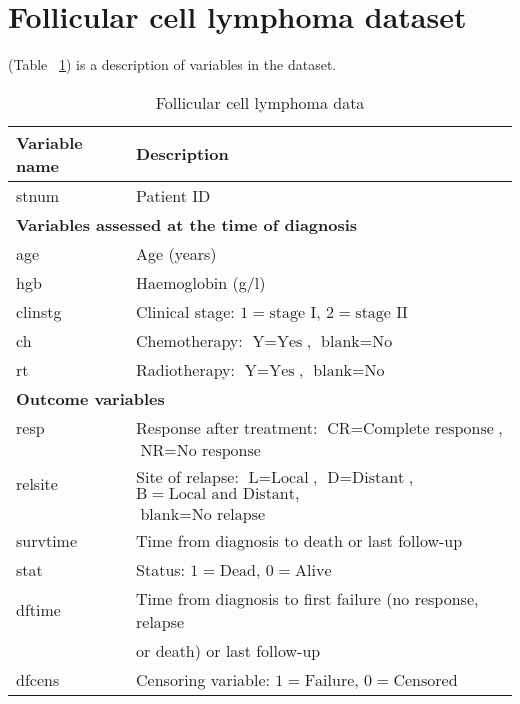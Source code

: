 \documentclass[times, doublespace]{simauth}
\begin{document}
\section{Follicular cell lymphoma dataset}\label{appA}
(Table ~\ref{tab:lymph}) is a description of variables in the dataset.
\begin{table}[t]\label{follicular}
	\begin{center}
		\caption{Follicular cell lymphoma data}\label{tab:lymph}
		\begin{tabular}{ll}
		\hline
			Variable name&Description\\
		\hline
		stnum & Patient ID\\
		\cline{1-2}
		\multicolumn{2}{l}{{\bf Variables assessed at the time of diagnosis}}\\
		age & Age (years)\\
		hgb & Haemoglobin (g/l)\\
		clinstg & Clinical stage: $1 = \text{stage I}$, $2 = \text{stage II}$\\
		ch & Chemotherapy: $\text{Y} = \text{Yes}$, $\text{blank} = \text{No}$\\
		rt & Radiotherapy: $\text{Y} = \text{Yes}$, $\text{blank} = \text{No}$\\
		\cline{1-2}
		\multicolumn{2}{l}{{\bf Outcome variables}}\\
		resp & Response after treatment: $\text{CR} = \text{Complete response}$,\\
		& $\text{NR} = \text{No response}$\\
		relsite & Site of relapse: $\text{L}  = \text{Local}$, $\text{D} = \text{Distant}$, $\text{B} = \text{Local and Distant},$\\
		 & $\text{blank} = \text{No relapse}$\\
		 survtime & Time from diagnosis to death or last follow-up\\
		 stat & Status: $1 = \text{Dead}$, $0 = \text{Alive}$\\
		 dftime & Time from diagnosis to first failure (no response, relapse\\
		 & or death) or last follow-up\\
		 dfcens & Censoring variable: $1 = \text{Failure}$, $0 = \text{Censored}$\\
		 \hline
		\end{tabular}
	\end{center}
\end{table}
\end{document}
